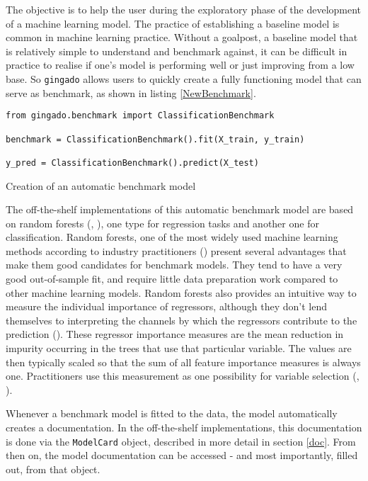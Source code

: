 \documentclass{article}
\begin{document}
The objective is to help the user during the exploratory phase of the development of a machine learning model. The practice of establishing a baseline model is common in machine learning practice. Without a goalpost, a baseline model that is relatively simple to understand and benchmark against, it can be difficult in practice to realise if one's model is performing well or just improving from a low base. So \texttt{gingado} allows users to quickly create a fully functioning model that can serve as benchmark, as shown in listing \ref{NewBenchmark}.

\begin{listing}[h]
\begin{verbatim}
from gingado.benchmark import ClassificationBenchmark

benchmark = ClassificationBenchmark().fit(X_train, y_train)

y_pred = ClassificationBenchmark().predict(X_test)
\end{verbatim} 
\caption{Creation of an automatic benchmark model}
\label{NewBenchmark}
\end{listing}

The off-the-shelf implementations of this automatic benchmark model are based on random forests (\cite{breiman1996bagging}, \cite{breiman2001random}), one type for regression tasks and another one for classification. Random forests, one of the most widely used machine learning methods according to industry practitioners (\cite{howard2020deep}) present several advantages that make them good candidates for benchmark models. They tend to have a very good out-of-sample fit, and require little data preparation work compared to other machine learning models. Random forests also provides an intuitive way to measure the individual importance of regressors, although they don't lend themselves to interpreting the channels by which the regressors contribute to the prediction (\cite{varian2014big}). These regressor importance measures are the mean reduction in impurity occurring in the trees that use that particular variable. The values are then typically scaled so that the sum of all feature importance measures is always one. Practitioners use this measurement as one possibility for variable selection (\cite{géron2017hands-on}, \cite{kohlscheen2021does}).

Whenever a benchmark model is fitted to the data, the model automatically creates a documentation. In the off-the-shelf implementations, this documentation is done via the \texttt{ModelCard} object, described in more detail in section \ref{doc}. From then on, the model documentation can be accessed - and most importantly, filled out, from that object.
\end{document}
